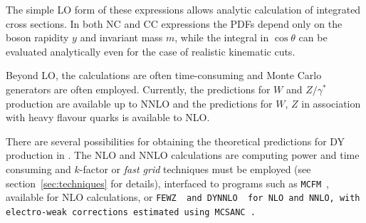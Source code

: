 The simple LO form of these expressions allows analytic calculation of integrated
cross sections.
In both NC and CC expressions the PDFs depend only on the boson rapidity \(y\) and
invariant mass \(m\), while
the integral in \(\cos\theta\) can be evaluated analytically
even for the case of realistic kinematic cuts.
%

Beyond LO, the calculations are often time-consuming and Monte Carlo generators are often employed. 
Currently, the predictions for $W$ and $Z/\gamma^*$ production are available up
to NNLO and the predictions for $W$, $Z$ in association with heavy flavour quarks is available to NLO.

There are several possibilities 
for obtaining the theoretical
predictions for DY production in \fitter. 
The NLO and NNLO calculations are computing power and time consuming
and $k$-factor or \emph{fast grid} techniques must be employed (see section~\ref{sec:techniques}
for details), interfaced to programs such as
\texttt{MCFM}~\cite{Campbell:1999ah,Campbell:2000je,Campbell:2010ff}, 
available for NLO calculations, or 
\tt FEWZ\rm~\cite{FEWZ} and \tt DYNNLO\rm~\cite{DYNNLO} for NLO and NNLO, with electro-weak corrections estimated using \tt MCSANC\rm~\cite{Bardin:2012jk, Bondarenko:2013nu}.
 





